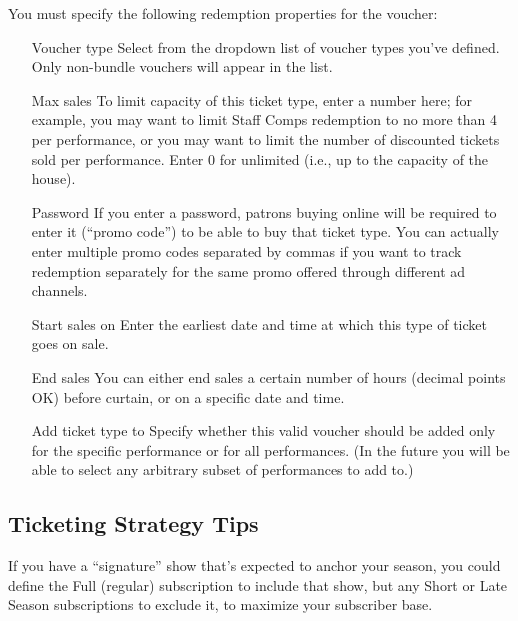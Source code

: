 You must specify the following redemption properties for the voucher:

\begin{itemize}
\item[Voucher type] Select from the dropdown list of voucher types
  you've defined.  Only non-bundle vouchers will appear in the list.
\item[Max sales] To limit capacity of this ticket type, enter a number
  here; for example, you may want to limit Staff Comps redemption to no
  more than 4 per performance, or you may want to limit the number of
  discounted tickets sold per performance. Enter 0 for unlimited (i.e.,
  up to the capacity of the house).
\item[Password] If you enter a password, patrons buying online will be
  required to enter it (``promo code'') to be able to buy that ticket
  type.  You can actually enter multiple promo codes separated by commas
  if you want to track redemption separately for the same promo offered
  through different ad channels.
\item[Start sales on] Enter the earliest date and time at which this
  type of ticket goes on sale.
\item[End sales] You can either end sales a certain number of hours
  (decimal points OK) before curtain, or on a specific date and time.
\item[Add ticket type to] Specify whether this valid voucher should be
  added only for the specific performance or for all performances. (In
  the future you will be able to select any arbitrary subset of
  performances to add to.)
\end{itemize}



\subsection{Ticketing Strategy Tips}
\label{sec:ticketingstrategy}

If you have a ``signature'' show that's expected to anchor your season,
you could define the Full (regular) subscription to include that show,
but any Short or Late Season subscriptions to exclude it, to maximize
your subscriber base.

